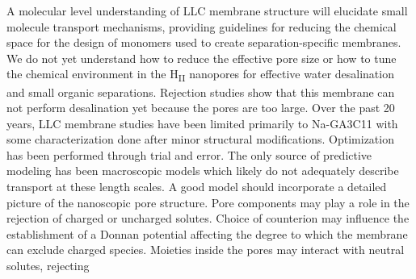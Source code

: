 A molecular level understanding of LLC membrane structure will elucidate
small molecule transport mechanisms, providing guidelines for reducing the
chemical space for the design of monomers used to create separation-specific
membranes. We do not yet understand how to reduce the effective pore
size or how to tune the chemical environment in the H\textsubscript{II} 
nanopores for effective water desalination and small organic separations.
Rejection studies show that this membrane can not perform desalination yet 
because the pores are too large\cite{zhou_supported_2005}. Over the past
20 years, LLC membrane studies have been limited primarily 
to Na-GA3C11 with some characterization done after minor structural 
modifications\cite{resel_structural_2000}. Optimization has been 
performed through trial and error. The only source of predictive modeling  %
has been macroscopic models which likely do not adequately describe 
transport at these length scales. A good model should incorporate a 
detailed picture of the nanoscopic pore structure. Pore components may 
play a role in the rejection of charged or uncharged solutes. Choice of 
counterion may influence the establishment of a Donnan potential
affecting the degree to which the membrane can exclude charged species.
Moieties inside the pores may interact with neutral solutes, rejecting
